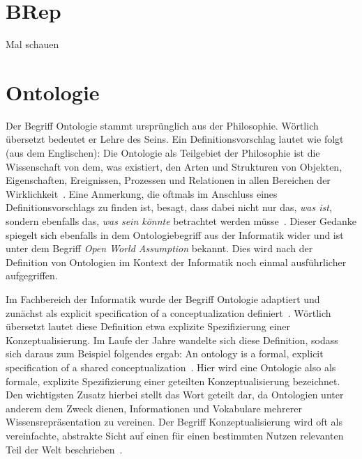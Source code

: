 \section{BRep}\label{basics:brep}
Mal schauen

\section{Ontologie}\label{basics:ontologie}
Der Begriff Ontologie stammt ursprünglich aus der Philosophie.
Wörtlich übersetzt bedeutet er \glqq{}Lehre des Seins\grqq{}.
Ein Definitionsvorschlag lautet wie folgt (aus dem Englischen):
\glqq{}Die Ontologie als Teilgebiet der Philosophie ist die Wissenschaft von dem, was existiert, den Arten und Strukturen von Objekten, Eigenschaften, Ereignissen, Prozessen und Relationen in allen Bereichen der Wirklichkeit\grqq{}~\cite{Ontology}.
Eine Anmerkung, die oftmals im Anschluss eines Definitionsvorschlags zu finden ist, besagt, dass dabei nicht nur das, \textit{was ist}, sondern ebenfalls das, \textit{was sein könnte} betrachtet werden müsse~\cite{Ontology}\cite{OntologieDefinitionLMU:online}.
Dieser Gedanke spiegelt sich ebenfalls in dem Ontologiebegriff aus der Informatik wider und ist unter dem Begriff \textit{Open World Assumption} bekannt.
Dies wird nach der Definition von Ontologien im Kontext der Informatik noch einmal ausführlicher aufgegriffen.

Im Fachbereich der Informatik wurde der Begriff Ontologie adaptiert und zunächst als \glqq{}explicit specification of a conceptualization\grqq{} definiert~\cite{Gruber1993}.
Wörtlich übersetzt lautet diese Definition etwa \glqq{}explizite Spezifizierung einer Konzeptualisierung\grqq{}.
Im Laufe der Jahre wandelte sich diese Definition, sodass sich daraus zum Beispiel folgendes ergab: \glqq{}An ontology is a formal, explicit specification of a shared conceptualization\grqq{}~\cite{Studer1998}.
Hier wird eine Ontologie also als \glqq{}formale, explizite Spezifizierung einer geteilten Konzeptualisierung\grqq{} bezeichnet.
Den wichtigsten Zusatz hierbei stellt das Wort \glqq{}geteilt\grqq{} dar, da Ontologien unter anderem dem Zweck dienen, Informationen und Vokabulare mehrerer Wissensrepräsentation zu vereinen.
Der Begriff Konzeptualisierung wird oft als \glqq{}vereinfachte, abstrakte Sicht auf einen für einen bestimmten Nutzen relevanten Teil der Welt\grqq{} beschrieben~\cite{Guarino2009}.

